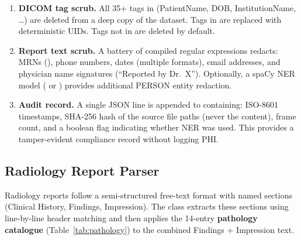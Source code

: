 \begin{enumerate}
  \item \textbf{DICOM tag scrub.} All 35+ tags in
         (PatientName, DOB,
        InstitutionName, \dots) are deleted from a deep copy of the dataset.
        Tags in  are replaced with
        deterministic  UIDs.
        Tags not in  are deleted by default.

  \item \textbf{Report text scrub.}
        A battery of compiled regular expressions redacts:
        MRNs (),
        phone numbers, dates (multiple formats), email addresses, and
        physician name signatures (``Reported by Dr.~X'').
        Optionally, a spaCy \textsc{NER} model ( or
        ) provides additional PERSON entity
        redaction.

  \item \textbf{Audit record.}
        A single JSON line is appended to
         containing: ISO-8601 timestamps,
        SHA-256 hash of the source file paths (never the content), frame
        count, and a boolean flag indicating whether NER was used.
        This provides a tamper-evident compliance record without logging PHI.
\end{enumerate}

\subsection{Radiology Report Parser}
\label{sec:report_parser}

Radiology reports follow a semi-structured free-text format with named
sections (Clinical History, Findings, Impression). The
 class extracts these sections using line-by-line header
matching and then applies the 14-entry \textbf{pathology catalogue}
(Table~\ref{tab:pathology}) to the combined Findings + Impression text.

